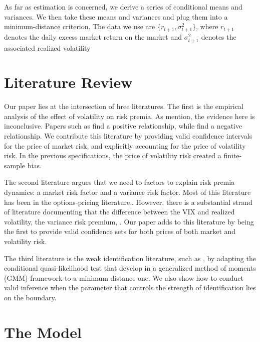 \documentclass[11pt, letterpaper, twoside]{article}
\begin{document}
As far as estimation is concerned, we derive a series of conditional means and variances. We then take these means and variances and plug them into a minimum-distance  criterion. The data we use are $\lbrace r_{t+1}, \sigma^2_{t+1} \rbrace$, where $r_{t+1}$ denotes the daily excess market return on the market and $\sigma^2_{t+1}$ denotes the associated realized volatility 

\section{Literature Review}\label{sec:lit_review}

Our paper lies at the intersection of hree literatures. The first is the empirical analysis of the effect of volatility on risk premia. As \textcite[619]{lettau2010measuring} mention,  the evidence here is inconclusive. Papers such as \textcites{bollerslev1988, harvey1989, ghysels2005, balli2006there, ludvigson2007} find a positive relationship, while \textcites{campbell1987, breen1987, pagan1991, whitelaw1994, brandt2004relationship} find a negative relationship. We contribute this literature by providing valid confidence intervals for the price of market risk, and explicitly accounting for the price of volatility risk. In the previous specifications, the price of volatility risk created a finite-sample bias.

The second literature argues that we need to factors to explain risk premia dynamics: a market risk factor and a variance risk factor. Most of this literature has been in the options-pricing literature,\parencites{christoffersen2010option, feunou2014risk, dewbecker2017price}. However, there is a substantial strand of literature documenting that the difference between the VIX and realized volatility, the variance risk premium, \parencites{bollerslev2006, dreschler2011whats}.  Our paper adds to this literature by being the first to provide valid confidence sets for both prices of both market and volatility risk.

The third literature is the weak identification literature, such as \textcites{mikusheva2016, andrews2012estimation}, by adapting the conditional quasi-likelihood test that \textcite{mmickusheva2016} develop in a generalized method of moments (GMM) framework to a minimum distance one. We also show how to conduct valid inference when the parameter that controls the strength of identification lies on the boundary.

\section{The Model}\label{sec:model}
\end{document}
